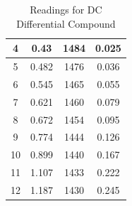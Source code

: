 \documentclass[a4paper,12pt]{article}
\begin{document}
\begin{table}[H]
\begin{subtable}[t]{0.45\textwidth}
\begin{tabular}{|c|c|c|c|}
				4                                                            & 0.43                                                                               & 1484                                                                 & 0.025                                                                \\ \hline
				5                                                            & 0.482                                                                              & 1476                                                                 & 0.036                                                                \\ \hline
				6                                                            & 0.545                                                                              & 1465                                                                 & 0.055                                                                \\ \hline
				7                                                            & 0.621                                                                              & 1460                                                                 & 0.079                                                                \\ \hline
				8                                                            & 0.672                                                                              & 1454                                                                 & 0.095                                                                \\ \hline
				9                                                            & 0.774                                                                              & 1444                                                                 & 0.126                                                                \\ \hline
				10                                                           & 0.899                                                                              & 1440                                                                 & 0.167                                                                \\ \hline
				11                                                           & 1.107                                                                              & 1433                                                                 & 0.222                                                                \\ \hline
				12                                                           & 1.187                                                                              & 1430                                                                 & 0.245                                                                \\ \hline
			\end{tabular}
			\caption{Readings for DC Differential Compound  }
		\end{subtable}
	\end{table}
\end{document}
